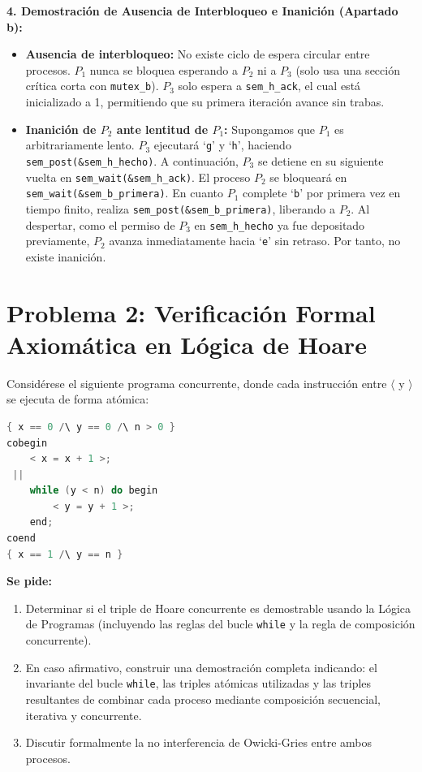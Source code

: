 \documentclass[11pt,a4paper,twoside,openright]{report}
\begin{document}
\begin{solucion}
\textbf{4. Demostración de Ausencia de Interbloqueo e Inanición (Apartado b):}
\begin{itemize}
    \item \textbf{Ausencia de interbloqueo:} No existe ciclo de espera circular entre procesos. $P_1$ nunca se bloquea esperando a $P_2$ ni a $P_3$ (solo usa una sección crítica corta con \texttt{mutex\_b}). $P_3$ solo espera a \texttt{sem\_h\_ack}, el cual está inicializado a 1, permitiendo que su primera iteración avance sin trabas.
    \item \textbf{Inanición de $P_2$ ante lentitud de $P_1$:} Supongamos que $P_1$ es arbitrariamente lento. $P_3$ ejecutará `\texttt{g}' y `\texttt{h}', haciendo \texttt{sem\_post(\&sem\_h\_hecho)}. A continuación, $P_3$ se detiene en su siguiente vuelta en \texttt{sem\_wait(\&sem\_h\_ack)}. El proceso $P_2$ se bloqueará en \texttt{sem\_wait(\&sem\_b\_primera)}. En cuanto $P_1$ complete `\texttt{b}' por primera vez en tiempo finito, realiza \texttt{sem\_post(\&sem\_b\_primera)}, liberando a $P_2$. Al despertar, como el permiso de $P_3$ en \texttt{sem\_h\_hecho} ya fue depositado previamente, $P_2$ avanza inmediatamente hacia `\texttt{e}' sin retraso. Por tanto, no existe inanición.
\end{itemize}
\end{solucion}

\newpage

\section{Problema 2: Verificación Formal Axiomática en Lógica de Hoare}

\begin{ejercicio}
Considérese el siguiente programa concurrente, donde cada instrucción entre $\langle$ y $\rangle$ se ejecuta de forma atómica:
\begin{lstlisting}[language=C++]
{ x == 0 /\ y == 0 /\ n > 0 }
cobegin
    < x = x + 1 >;
 ||
    while (y < n) do begin
        < y = y + 1 >;
    end;
coend
{ x == 1 /\ y == n }
\end{lstlisting}

\textbf{Se pide:}
\begin{enumerate}[label=(\alph*)]
    \item Determinar si el triple de Hoare concurrente es demostrable usando la Lógica de Programas (incluyendo las reglas del bucle \texttt{while} y la regla de composición concurrente).
    \item En caso afirmativo, construir una demostración completa indicando: el invariante del bucle \texttt{while}, las triples atómicas utilizadas y las triples resultantes de combinar cada proceso mediante composición secuencial, iterativa y concurrente.
    \item Discutir formalmente la no interferencia de Owicki-Gries entre ambos procesos.
\end{enumerate}
\end{ejercicio}
\end{document}
